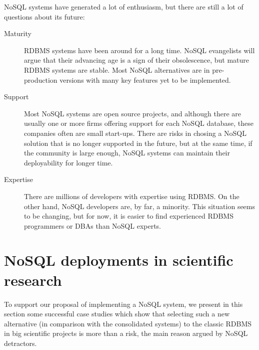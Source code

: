 NoSQL systems have generated a lot of enthusiasm, but there are still a lot of questions about its future:

\begin{description} %

\item[Maturity] %

RDBMS systems have been around for a long time. NoSQL evangelists will argue that their advancing age is a sign of their obsolescence, but mature RDBMS systems are stable. Most NoSQL alternatives are in pre-production versions with many key features yet to be implemented.

\item[Support] %

Most NoSQL systems are open source projects, and although there are usually one or more firms offering support for each NoSQL database, these companies often are small start-ups.
There are risks in chosing a NoSQL solution that is no longer supported in the future, but at the same time, if the community is large enough, NoSQL systems can maintain their deployability for longer time.

\item[Expertise] %

There are millions of developers with expertise using RDBMS. On
the %
other hand, NoSQL developers are, by far, a minority. This situation seems to
be changing, %
but for now, it is easier to find experienced RDBMS programmers or
DBAs %
than NoSQL experts.

\end{description} %


\section{NoSQL deployments in scientific research} %
\label{sec:nosql_deployments_in_scientific_research}

To support our proposal of implementing a NoSQL system, we present in this section some successful case studies which show that selecting such a new alternative (in comparison with the consolidated systems) to the classic RDBMS in big scientific projects is more than a risk, the main reason argued by NoSQL detractors.

